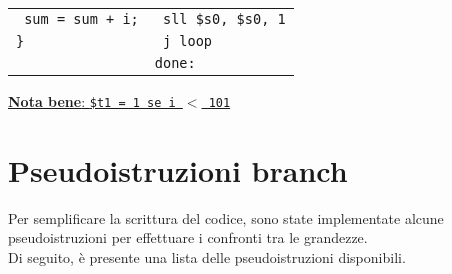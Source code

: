\documentclass[../main.tex]{subfiles}
\begin{document}
\begin{tabular}{ p{9cm} p{9cm} }
    \texttt{ \hspace{0cm} sum = sum + i;} & \texttt{ \hspace{0cm} \hspace{0cm} \hspace{0cm} \hspace{0cm} \hspace{0cm} \hspace{0cm} sll \$s0, \$s0, 1} \\
    \texttt{\}} & \texttt{ \hspace{0cm} \hspace{0cm} \hspace{0cm} \hspace{0cm} \hspace{0cm} \hspace{0cm} j loop} \\
    & \texttt{done:} \\
\end{tabular}

\noindent
\underline{\textbf{Nota bene}: \texttt{\$t1 = 1 se i $<$ 101}}

\section{Pseudoistruzioni branch}
Per semplificare la scrittura del codice, sono state implementate alcune
pseudoistruzioni per effettuare i confronti tra le grandezze. \\
Di seguito, è presente una lista delle pseudoistruzioni disponibili.
\end{document}
